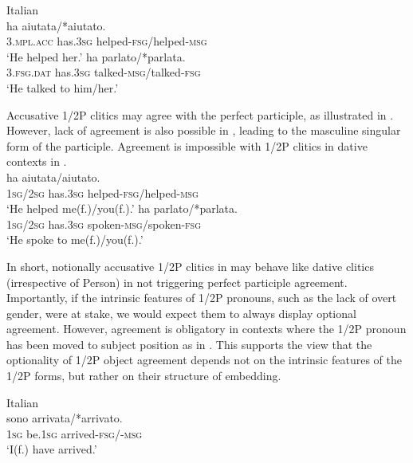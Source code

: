\documentclass[output=paper,colorlinks,citecolor=brown,modfonts,nonflat]{langsci/langscibook}
\begin{document}
\ea%
    \label{ex:manzini:14}
    Italian\\
    \ea\label{ex:manzini:14a}
         {ha}     {aiutata/*aiutato}.\\
        \textsc{3.mpl.acc}  has.\textsc{3sg}    helped-\textsc{fsg/}helped\textsc{{}-msg}\\
    \glt ‘He helped her.’
    \ex\label{ex:manzini:14b}
           {ha}     {parlato/*parlata}.\\
        \textsc{3.fsg.dat}  has.\textsc{3sg}    talked-\textsc{msg/}talked\textsc{{}-fsg}\\
    \glt ‘He talked to him/her.’
    \z
\z

Accusative 1/2P clitics may agree with the perfect participle, as illustrated in . However, lack of agreement is also possible in , leading to the masculine singular form of the participle. Agreement is impossible with 1/2P clitics in dative contexts in .\\

\ea%
    \label{ex:manzini:15}
    \ea\label{ex:manzini:15a}
         {ha}     {aiutata/aiutato}.\\
        \textsc{1sg/2sg}  has\textsc{.3sg}    helped\textsc{{}-fsg/}helped\textsc{{}-msg}\\
    \glt ‘He helped me(f.)/you(f.).’
\ex\label{ex:manzini:15b}
            {ha}     {parlato/*parlata}.\\
        \textsc{1sg/2sg}  has\textsc{.3sg}    spoken\textsc{{}-msg/}spoken\textsc{{}-fsg}\\
    \glt ‘He spoke to me(f.)/you(f.).’
    \z
\z

In short, notionally accusative 1/2P clitics in  may behave like dative clitics (irrespective of Person) in not triggering perfect participle agreement. Importantly, if the intrinsic features of 1/2P pronouns, such as the lack of overt gender, were at stake, we would expect them to always display optional agreement. However, agreement is obligatory in contexts where the 1/2P pronoun has been moved to subject position as in . This supports the view that the optionality of 1/2P object agreement depends not on the intrinsic features of the 1/2P forms, but rather on their structure of embedding.

\ea%
    \label{ex:manzini:16}
    Italian\\
      {sono}     {arrivata/*arrivato}.\\
        \textsc{1sg}  be.\textsc{1sg}   arrived\textsc{{}-fsg/-msg}\\
    \glt ‘I(f.) have arrived.’
\z
\end{document}
